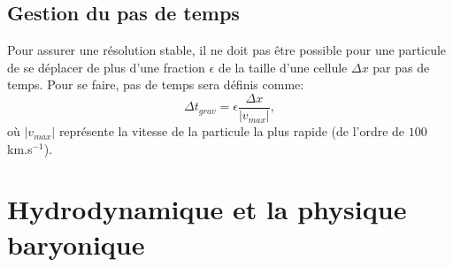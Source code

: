 %
%


%

\subsection{Gestion du pas de temps}
\label{sec:dtgrav}

Pour assurer une résolution stable, il ne doit pas être possible pour une particule de se déplacer de plus d'une fraction $\epsilon$ de la taille d'une cellule $\Delta x$ par pas de temps.
Pour se faire, pas de temps sera définis comme:
\begin{equation}
\Delta t_{grav} = \epsilon \frac{\Delta x}{|v_{max}|},
\end{equation}
où $|v_{max}|$ représente la vitesse de la particule la plus rapide (de l'ordre de $100$ km.s$^{-1}$).


\clearpage
\section{Hydrodynamique et la physique baryonique}
\label{sec:hydro}
%
%

